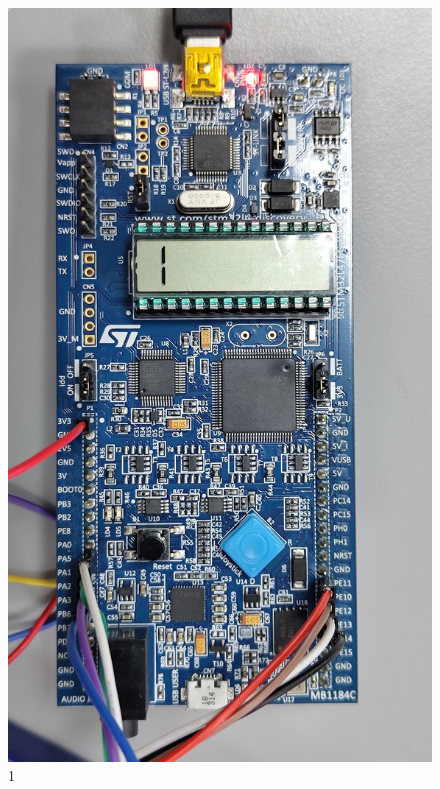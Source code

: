 \documentclass[12pt]{article}
\begin{document}
\begin{figure}[h!]
    \centering
    \begin{minipage}{0.45\textwidth}
    \centering
    \includegraphics[width=\textwidth]{1.jpg}
    \caption{1}
    \end{minipage}
    \hfill
    \begin{minipage}{0.45\textwidth}
        \centering

\end{minipage}
\end{figure}
\end{document}
